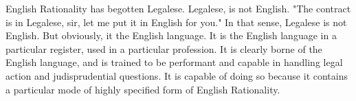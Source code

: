 \separator
English Rationality has begotten Legalese. Legalese, is not English. "The contract is in Legalese, sir, let me put it in English for you." In that sense, Legalese is not English. But obviously, it the English language. It is the English language in a particular register, used in a particular profession. It is clearly borne of the English language, and is trained to be performant and capable in handling legal action and judisprudential questions. It is capable of doing so because it contains a particular mode of highly specified form of English Rationality. 


\separator